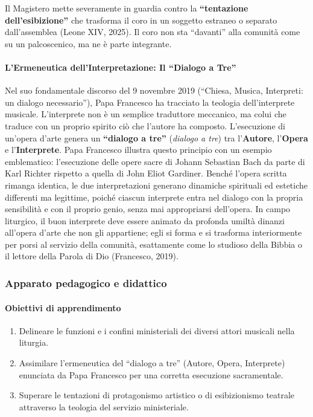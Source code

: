 \documentclass[12pt,a4paper]{article}
\begin{document}
	Il Magistero mette severamente in guardia contro la \textbf{``tentazione dell'esibizione''} che trasforma il coro in un soggetto estraneo o separato dall'assemblea (Leone XIV, 2025). Il coro non sta ``davanti'' alla comunità come su un palcoscenico, ma ne è parte integrante.
	
	\paragraph{L'Ermeneutica dell'Interpretazione: Il ``Dialogo a Tre''}\label{lermeneutica-dellinterpretazione-il-dialogo-a-tre}
	
	Nel suo fondamentale discorso del 9 novembre 2019 (``Chiesa, Musica, Interpreti: un dialogo necessario''), Papa Francesco ha tracciato la teologia dell'interprete musicale. L'interprete non è un semplice traduttore meccanico, ma colui che traduce con un proprio spirito ciò che l'autore ha composto. L'esecuzione di un'opera d'arte genera un \textbf{``dialogo a tre''} (\emph{dialogo a tre}) tra l'\textbf{Autore}, l'\textbf{Opera} e l'\textbf{Interprete}. Papa Francesco illustra questo principio con un esempio emblematico: l'esecuzione delle opere sacre di Johann Sebastian Bach da parte di Karl Richter rispetto a quella di John Eliot Gardiner. Benché l'opera scritta rimanga identica, le due interpretazioni generano dinamiche spirituali ed estetiche differenti ma legittime, poiché ciascun interprete entra nel dialogo con la propria sensibilità e con il proprio genio, senza mai appropriarsi dell'opera. In campo liturgico, il buon interprete deve essere animato da profonda umiltà dinanzi all'opera d'arte che non gli appartiene; egli si forma e si trasforma interiormente per porsi al servizio della comunità, esattamente come lo studioso della Bibbia o il lettore della Parola di Dio (Francesco, 2019).
	
	\subsubsection{Apparato pedagogico e didattico}\label{apparato-pedagogico-e-didattico-7}
	
	\paragraph{Obiettivi di apprendimento}\label{obiettivi-di-apprendimento-7}
	
	\begin{enumerate}[label=\arabic*.,leftmargin=*]
		\item Delineare le funzioni e i confini ministeriali dei diversi attori musicali nella liturgia.
		\item Assimilare l'ermeneutica del ``dialogo a tre'' (Autore, Opera, Interprete) enunciata da Papa Francesco per una corretta esecuzione sacramentale.
		\item Superare le tentazioni di protagonismo artistico o di esibizionismo teatrale attraverso la teologia del servizio ministeriale.
	\end{enumerate}
	
\end{document}
